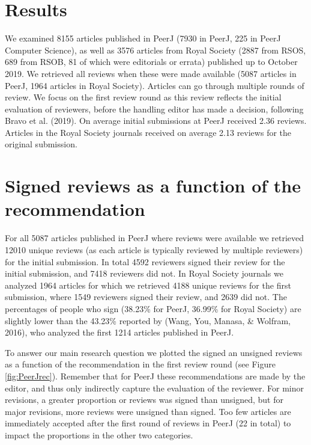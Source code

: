 \documentclass[,jou, a4paper,floatsintext]{apa6}
\begin{document}
\hypertarget{results}{%
\section{Results}\label{results}}

We examined 8155 articles published in PeerJ (7930 in PeerJ, 225 in PeerJ Computer Science), as well as 3576 articles from Royal Society (2887 from RSOS, 689 from RSOB, 81 of which were editorials or errata) published up to October 2019. We retrieved all reviews when these were made available (5087 articles in PeerJ, 1964 articles in Royal Society). Articles can go through multiple rounds of review. We focus on the first review round as this review reflects the initial evaluation of reviewers, before the handling editor has made a decision, following Bravo et al. (2019). On average initial submissions at PeerJ received 2.36 reviews. Articles in the Royal Society journals received on average 2.13 reviews for the original submission.

\hypertarget{signed-reviews-as-a-function-of-the-recommendation}{%
\section{Signed reviews as a function of the recommendation}\label{signed-reviews-as-a-function-of-the-recommendation}}

For all 5087 articles published in PeerJ where reviews were available we retrieved 12010 unique reviews (as each article is typically reviewed by multiple reviewers) for the initial submission. In total 4592 reviewers signed their review for the initial submission, and 7418 reviewers did not. In Royal Society journals we analyzed 1964 articles for which we retrieved 4188 unique reviews for the first submission, where 1549 reviewers signed their review, and 2639 did not. The percentages of people who sign (38.23\% for PeerJ, 36.99\% for Royal Society) are slightly lower than the 43.23\% reported by (Wang, You, Manasa, \& Wolfram, 2016), who analyzed the first 1214 articles published in PeerJ.

To answer our main research question we plotted the signed an unsigned reviews as a function of the recommendation in the first review round (see Figure \ref{fig:PeerJrec}). Remember that for PeerJ these recommendations are made by the editor, and thus only indirectly capture the evaluation of the reviewer. For minor revisions, a greater proportion or reviews was signed than unsigned, but for major revisions, more reviews were unsigned than signed. Too few articles are immediately accepted after the first round of reviews in PeerJ (22 in total) to impact the proportions in the other two categories.
\end{document}
